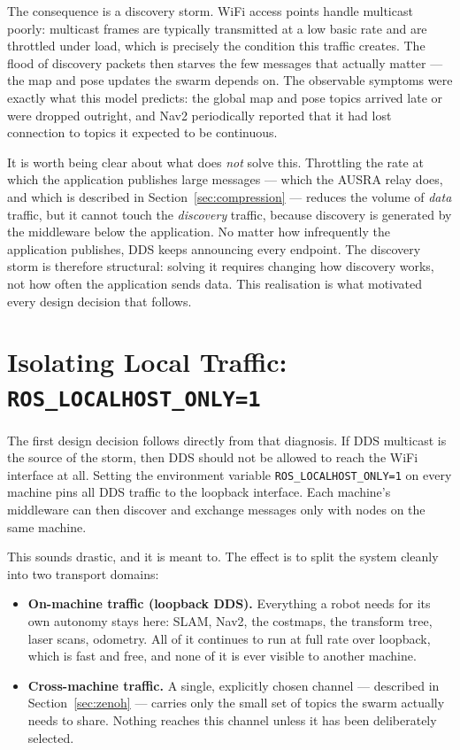 The consequence is a discovery storm. WiFi access points handle multicast poorly: multicast frames are typically transmitted at a low basic rate and are throttled under load, which is precisely the condition this traffic creates. The flood of discovery packets then starves the few messages that actually matter --- the map and pose updates the swarm depends on. The observable symptoms were exactly what this model predicts: the global map and pose topics arrived late or were dropped outright, and Nav2 periodically reported that it had lost connection to topics it expected to be continuous.

It is worth being clear about what does \emph{not} solve this. Throttling the rate at which the application publishes large messages --- which the AUSRA relay does, and which is described in Section~\ref{sec:compression} --- reduces the volume of \emph{data} traffic, but it cannot touch the \emph{discovery} traffic, because discovery is generated by the middleware below the application. No matter how infrequently the application publishes, DDS keeps announcing every endpoint. The discovery storm is therefore structural: solving it requires changing how discovery works, not how often the application sends data. This realisation is what motivated every design decision that follows.

\section{Isolating Local Traffic: \texttt{ROS\_LOCALHOST\_ONLY=1}}
\label{sec:localhost_only}

The first design decision follows directly from that diagnosis. If DDS multicast is the source of the storm, then DDS should not be allowed to reach the WiFi interface at all. Setting the environment variable \texttt{ROS\_LOCALHOST\_ONLY=1} on every machine pins all DDS traffic to the loopback interface. Each machine's middleware can then discover and exchange messages only with nodes on the same machine.

This sounds drastic, and it is meant to. The effect is to split the system cleanly into two transport domains:

\begin{itemize}
    \item \textbf{On-machine traffic (loopback DDS).} Everything a robot needs for its own autonomy stays here: SLAM, Nav2, the costmaps, the transform tree, laser scans, odometry. All of it continues to run at full rate over loopback, which is fast and free, and none of it is ever visible to another machine.
    \item \textbf{Cross-machine traffic.} A single, explicitly chosen channel --- described in Section~\ref{sec:zenoh} --- carries only the small set of topics the swarm actually needs to share. Nothing reaches this channel unless it has been deliberately selected.
\end{itemize}

